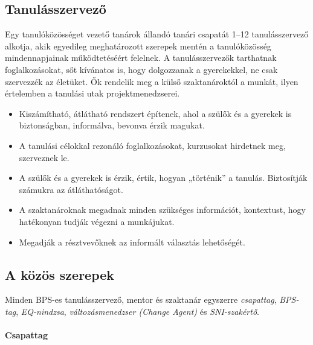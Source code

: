\vspace*{.5ex}
\hypertarget{tanulasszervezo}{%
\subsection{Tanulásszervező}\label{tanulasszervezo}}

Egy tanulóközösséget vezető tanárok állandó tanári csapatát 1--12
tanulásszervező alkotja, akik egyedileg meghatározott szerepek mentén a
tanulóközösség mindennapjainak működtetéséért felelnek. A
tanulásszervezők tarthatnak foglalkozásokat, sőt kívánatos is, hogy
dolgozzanak a gyerekekkel, ne csak szervezzék az életüket. Ők rendelik
meg a külső szaktanároktól a munkát, ilyen értelemben a tanulási utak
projektmenedzserei.

\begin{itemize}
\tightlist
\item
  Kiszámítható, átlátható rendszert építenek, ahol a szülők és a gyerekek is
  biztonságban, informálva, bevonva érzik magukat.
\item
  A tanulási célokkal rezonáló foglalkozásokat, kurzusokat hirdetnek meg,
  szerveznek le.
\item
  A szülők és a gyerekek is érzik, értik, hogyan „történik'' a tanulás.
  Biztosítják számukra az átláthatóságot.
\item
  A szaktanároknak megadnak minden szükséges információt, kontextust, hogy
  hatékonyan tudják végezni a munkájukat.
\item
  Megadják a résztvevőknek az informált választás lehetőségét.
\end{itemize}

\hypertarget{a-kozos-szerepek}{%
\subsection{A közös szerepek}\label{a-kozos-szerepek}}

Minden BPS-es tanulásszervező, mentor és szaktanár egyszerre
\emph{csapattag}, \emph{BPS-tag}, \emph{EQ-nindzsa},
\emph{változásmenedzser (Change Agent)} és \emph{SNI-szakértő}.

\hypertarget{csapattag}{%
\paragraph{Csapattag}\label{csapattag}}

